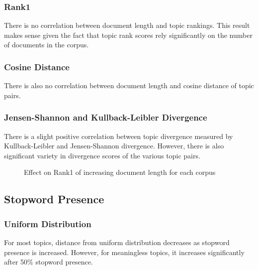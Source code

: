 \documentclass[letterpaper, 10 pt, conference]{ieeeconf}  %
\begin{document}
\subsubsection{Rank1}
There is no correlation between document length and topic rankings. This result makes sense given the fact that topic rank scores rely significantly on the number of documents in the corpus.

\subsubsection{Cosine Distance}
There is also no correlation between document length and cosine distance of topic pairs.

\subsubsection{Jensen-Shannon and Kullback-Leibler Divergence}
There is a slight positive correlation between topic divergence measured by Kullback-Leibler and Jensen-Shannon divergence. However, there is also significant variety in divergence scores of the various topic pairs.

\begin{figure}[thpb]
      \centering
      \caption{Effect on Rank1 of increasing document length for each corpus}
      \label{fig:dl_kld}
   \end{figure}

\subsection{Stopword Presence}

\subsubsection{Uniform Distribution}
For most topics, distance from uniform distribution decreases as stopword presence is increased. However, for meaningless topics, it increases significantly after 50\% stopword presence. 
\end{document}

